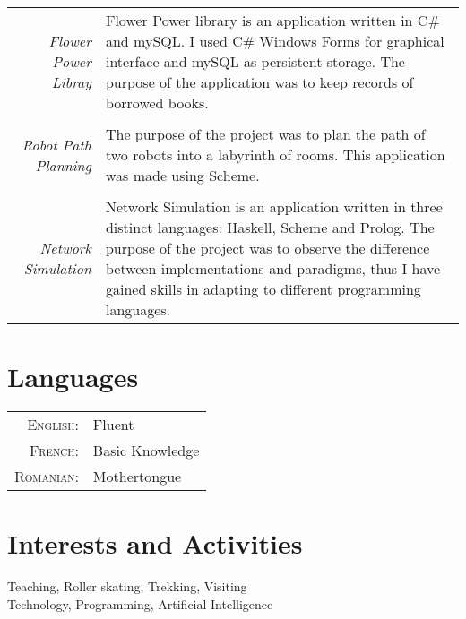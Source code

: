 \documentclass[a4paper,10pt]{article} %
\begin{document}
\begin{tabular}{r|p{11cm}}
\emph{Flower Power Libray}
& \footnotesize{Flower Power library is an application written in C\# and mySQL. I used C\# Windows Forms for graphical interface and mySQL as persistent storage. The purpose of the application was to keep records of borrowed books.}\\
\multicolumn{2}{c}{} \\

\emph{Robot Path Planning}
& \footnotesize{The purpose of the project was to plan the path of two robots into a labyrinth of rooms. This application was made using Scheme.}\\
\multicolumn{2}{c}{} \\


\emph{Network Simulation}
& \footnotesize{Network Simulation is an application written in three distinct languages: Haskell, Scheme and Prolog. The purpose of the project was to observe the difference between implementations and paradigms, thus I have gained skills in adapting to different programming languages.}
\end{tabular}


\section{Languages}

\begin{tabular}{rl}
\textsc{English:} & Fluent\\
\textsc{French:} & Basic Knowledge\\
\textsc{Romanian:} & Mothertongue\\
\end{tabular}


\section{Interests and Activities}

Teaching, Roller skating, Trekking, Visiting\\
Technology, Programming, Artificial Intelligence

\end{document}
